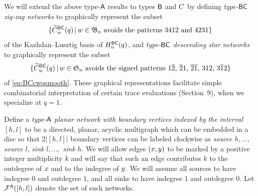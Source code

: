 \documentclass[11pt]{article}
\theoremstyle{definition}
\numberwithin{equation}{section}
\begin{document}
We will extend the above type-$\mathsf{A}$ results to types $\mathsf{B}$ and $\sfC$
by defining {\em type-$\mathsf{BC}$ zig-zag networks}
to graphically represent the subset
\begin{equation}\label{eq:BCcwqsmooth}
  \{ \btc wq \,|\, w \in \bn \text{ \avoidsp} \}
\end{equation}
of the Kazhdan--Lusztig basis of $H_n^{\mathsf{BC}}(q)$,
and {\em type-$\mathsf{BC}$ descending star networks}
to graphically represent the subset
\begin{equation}\label{eq:BCcwqcodom}
  \{ \btc wq \,|\, w \in \sn \text{ \avoidssignedp } \}
\end{equation}
of \eqref{eq:BCcwqsmooth}.
These graphical representations facilitate
simple combinatorial interpretation of certain trace evaluations
(Section~9), when we specialize at $q=1$.


\label{ss:Aplanar}

Define a {\em type-$\mathsf{A}$ planar network with boundary vertices indexed by
the interval $[h,l]$}
to be a directed, planar,
acyclic multigraph which can be embedded in a disc so that
$2|[h,l]|$ boundary vertices can be labeled clockwise as
{\em source} $h, \dotsc,$ {\em source} $l$,
{\em sink} $l, \dotsc,$ {\em sink} $h$.
We will allow edges $(x, y)$
to be marked by a positive integer multiplicity $k$
and will say that such an edge contributes $k$ to the outdegree of $x$
and to the indegree of $y$.
We will assume all sources to have indegree $0$ and outdegree $1$,
and all sinks to have indegree $1$ and outdegree $0$.
Let $\mathcal F^{\mathsf{A}}([h,l])$ denote the set of such networks.
\end{document}
